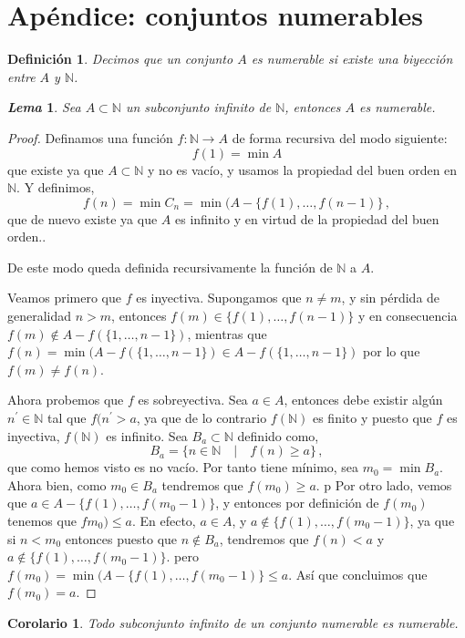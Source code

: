 \documentclass[12pt]{book}
\newtheorem{defn}{\bf Definición}[chapter]
\newtheorem{lema}{\it Lema}[chapter]
\newtheorem{coro}{Corolario}[chapter]
\def\NN{\mathbb{N}}
\begin{document}
\section{Apéndice: conjuntos numerables}
\begin{defn} Decimos que un conjunto $A$ es numerable si existe una biyección entre $A$ y $
\NN$.
\end{defn}
\begin{lema} Sea $A\subset \NN$ un subconjunto infinito de $\NN$, entonces $A$ es numerable.
\end{lema}
\begin{proof}
Definamos una función $f:\NN\longrightarrow A$ de forma recursiva del modo siguiente:
$$f(1)=\min A$$
que existe ya que $A\subset\NN$ y no es vacío, y usamos la propiedad del buen  orden en $\NN$. 
Y definimos,
$$f(n)=\min  C_n =\min (A-\{f(1),\dots,f(n-1)\}\,,$$
que de nuevo existe ya que $A$ es infinito  y en virtud de la propiedad del buen orden..

De este modo queda definida recursivamente  la función de $\NN$ a $A$. 

Veamos primero  que $f$ es inyectiva. Supongamos que $n\not=m$, y sin pérdida de generalidad 
$n>m$, entonces $f(m)\in \{f(1), \dots, f(n-1)\}$ y en consecuencia  $f(m)\not\in A-f(\{1,\dots,n-1\})$, 
mientras que $f(n)=\min(A-f(\{1,\dots,n-1\})\in A-f(\{1,\dots,n-1\})$  por  lo que $f(m)\not= f(n)$.

Ahora probemos que $f$ es sobreyectiva. Sea $a\in A$, entonces debe existir algún $n^\prime\in 
\NN$ tal que $f(n^\prime>a$, ya que de lo contrario $f(\NN)$  es finito y puesto que $f$ es 
inyectiva, $f(\NN)$  es infinito. Sea $B_a\subset \NN$ definido como,
$$B_a=\{n\in \NN\quad | \quad f(n)\geq a\}\,,$$
que como hemos visto es no vacío. Por tanto tiene mínimo, sea $m_0= \min B_a$. Ahora bien,  
como  $m_0\in B_a$ tendremos que $f(m_0)\geq a$. p Por otro lado, vemos que $a\in A-\{f(1),
\dots,f(m_0-1)\}$, y entonces por definición de $f(m_0)$ tenemos que $fm_0)\leq a$. En efecto,   
$a\in A$, y $a\not\in \{f(1),\dots, f(m_0-1)\}$, ya que si $n<m_0$ entonces puesto que $n\not\in 
B_a$,  tendremos que $f(n)<a$ y $a\not\in \{f(1),\dots,f( m_0-1)\}$. pero  $f(m_0)=\min (A-\{f(1),
\dots,f(m_0-1)\}\leq a$. Así que concluimos que $f(m_0)=a$.

\end{proof}
\begin{coro} Todo subconjunto infinito de un conjunto numerable es numerable.
\end{coro}
\end{document}
